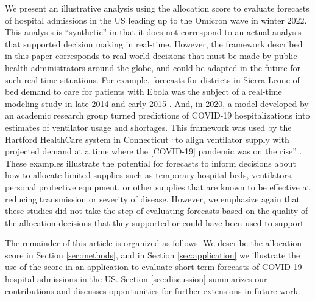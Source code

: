 \documentclass{article}
\begin{document}
We present an illustrative analysis using the allocation score to evaluate forecasts of hospital admissions in the US leading up to the Omicron wave in winter 2022.
This analysis is ``synthetic'' in that it does not correspond to an actual analysis that supported decision making in real-time.
However, the framework described in this paper corresponds to real-world decisions that must be made by public health administrators around the globe, and could be adapted in the future for such real-time situations.
For example, forecasts for districts in Sierra Leone of bed demand to care for patients with Ebola was the subject of a real-time modeling study in late 2014 and early 2015 \citep{camacho2015-ebola-bed}.
And, in 2020, a model developed by an academic research group turned predictions of COVID-19 hospitalizations into estimates of ventilator usage and shortages. This framework was used by the Hartford HealthCare system in Connecticut ``to align ventilator supply with projected demand at a time where the [COVID-19] pandemic was on the rise'' \citep{bertsimas2021predictionsCOVID}.
These examples illustrate the potential for forecasts to inform decisions about how to allocate limited supplies such as temporary hospital beds, ventilators, personal protective equipment, or other supplies that are known to be effective at reducing transmission or severity of disease.
However, we emphasize again that these studies did not take the step of evaluating forecasts based on the quality of the allocation decisions that they supported or could have been used to support.



The remainder of this article is organized as follows. 
We describe the allocation score in Section \ref{sec:methods}, and in Section \ref{sec:application} we illustrate the use of the score in an application to evaluate short-term forecasts of COVID-19 hospital admissions in the US.
Section \ref{sec:discussion} summarizes our contributions and discusses opportunities for further extensions in future work.
\end{document}
